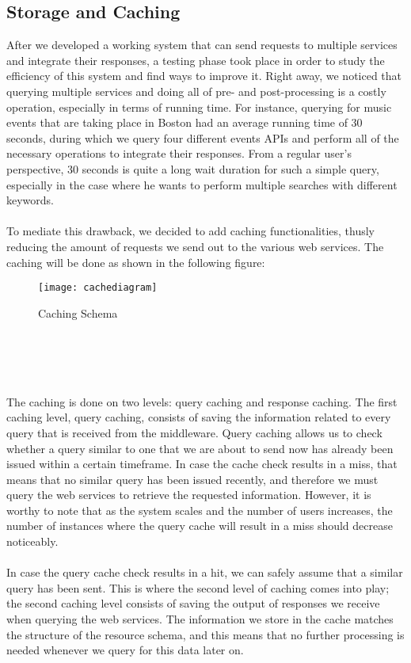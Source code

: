 \subsection{Storage and Caching}
After we developed a working system that can send requests to multiple services and integrate their responses, a testing phase took place in order to study the efficiency of this system and find ways to improve it. Right away, we noticed that querying multiple services and doing all of pre- and post-processing is a costly operation, especially in terms of running time. For instance, querying for music events that are taking place in Boston had an average running time of 30 seconds, during which we query four different events APIs and perform all of the necessary operations to integrate their responses. From a regular user's perspective, 30 seconds is quite a long wait duration for such a simple query, especially in the case where he wants to perform multiple searches with different keywords.\\\\
To mediate this drawback, we decided to add caching functionalities, thusly reducing the amount of requests we send out to the various web services. The caching will be done as shown in the following figure:\\
\begin{figure}[h]
\centering
\texttt{[image: cachediagram]}
\caption{Caching Schema}
\end{figure}
\\\\\\\\
The caching is done on two levels: query caching and response caching. The first caching level, query caching, consists of saving the information related to every query that is received from the middleware. Query caching allows us to check whether a query similar to one that we are about to send now has already been issued within a certain timeframe. In case the cache check results in a miss, that means that no similar query has been issued recently, and therefore we must query the web services to retrieve the requested information. However, it is worthy to note that as the system scales and the number of users increases, the number of instances where the query cache will result in a miss should decrease noticeably.\\\\
In case the query cache check results in a hit, we can safely assume that a similar query has been sent. This is where the second level of caching comes into play; the second caching level consists of saving the output of responses we receive when querying the web services. The information we store in the cache matches the structure of the resource schema, and this means that no further processing is needed whenever we query for this data later on.\\\\
